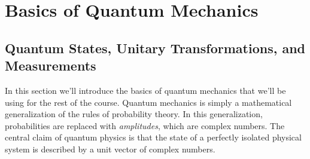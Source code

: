 \documentclass[11pt]{report}
\theoremstyle{plain}
\theoremstyle{definition}
\begin{document}
\section{Basics of Quantum Mechanics}

\subsection{Quantum States, Unitary Transformations, and Measurements}

In this section we'll introduce the basics of quantum mechanics that we'll be using for the rest of the course. Quantum mechanics is simply a mathematical generalization of the rules of probability theory. In this generalization, probabilities are replaced with \emph{amplitudes}, which are complex numbers. The central claim of quantum physics is that the state of a perfectly isolated physical system is described by a unit vector of complex numbers.
\end{document}
